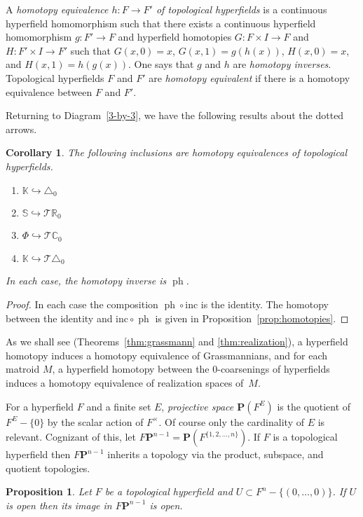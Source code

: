 \documentclass[10pt, preprint]{article}
\newtheorem{prop}[theorem]{Proposition}
\newtheorem{corollary}[theorem]{Corollary}
\theoremstyle{definition}
\begin{document}
A \emph{homotopy equivalence $h : F \to F'$ of topological hyperfields}
is a continuous hyperfield homomorphism such that there exists a
continuous hyperfield homomorphism $g : F' \to F$ and hyperfield
homotopies $G : F \times I \to F$ and $H : F' \times I \to F'$ such that
$G(x,0) = x$, $G(x,1) = g(h(x))$, $H(x,0) = x$, and $H(x,1) = h(g(x))$.
One says that $g$ and $h$ are \emph{homotopy inverses}. Topological
hyperfields $F$ and $F'$ are \emph{homotopy equivalent} if there is a
homotopy equivalence between $F$ and $F'$.

Returning to Diagram~\eqref{3-by-3}, we have the following results about
the dotted arrows.\vspace*{-2pt}

\begin{corollary}
\label{prop:4equivs}
The following inclusions are homotopy equivalences of topological
hyperfields.\vspace*{-2pt}
%
\begin{enumerate}[\textit{2.}]%
\item[\textit{1.}]
$\mathbb{K}\hookrightarrow \triangle _{0}$
%
\item[\textit{2.}]
$\mathbb{S}\hookrightarrow \mathcal{T }\mathbb{R}_{0}$
%
\item[\textit{3.}]
$\Phi \hookrightarrow \mathcal{T }\mathbb{C}_{0}$
%
\item[\textit{4.}]
$\mathbb{K}\hookrightarrow \mathcal{T }\triangle _{0}$\vspace*{-2pt}
\end{enumerate}
%
In each case, the homotopy inverse is $\operatorname{ph}$.\vspace*{-2pt}
\end{corollary}

\begin{proof}
In each case the composition $\operatorname{ph}\circ \text{inc}$ is the
identity. The homotopy between the identity and $\text{inc}\circ
\operatorname{ph}$ is given in Proposition~\ref{prop:homotopies}.
\end{proof}

As we shall see (Theorems~\ref{thm:grassmann} and \ref{thm:realization}), a hyperfield homotopy induces a homotopy
equivalence of Grassmannians, and for each matroid $M$, a hyperfield
homotopy between the 0-coarsenings of hyperfields induces a homotopy
equivalence of realization spaces of~$M$.

For a hyperfield $F$ and a finite set $E$, \emph{projective space
$\mathbf{P}(F^{E})$} is the quotient of $F^{E} - \{0\}$ by the scalar
action of $F^{\times }$. Of course only the cardinality of $E$ is
relevant. Cognizant of this, let $F\mathbf{P}^{n-1} = \mathbf{P}(F
^{\{1,2, \dots , n\}})$. If $F$ is a topological hyperfield then
$ F \mathbf{P}^{n-1}$ inherits a topology via the product, subspace, and
quotient topologies.
%
\begin{prop}
\label{open_map}
Let $F$ be a topological hyperfield and $U\subset F^{n}-\{(0,\ldots ,0)
\}$. If $U$ is open then its image in $F\mathbf{P}^{n-1}$ is open.
\end{prop}
\end{document}
